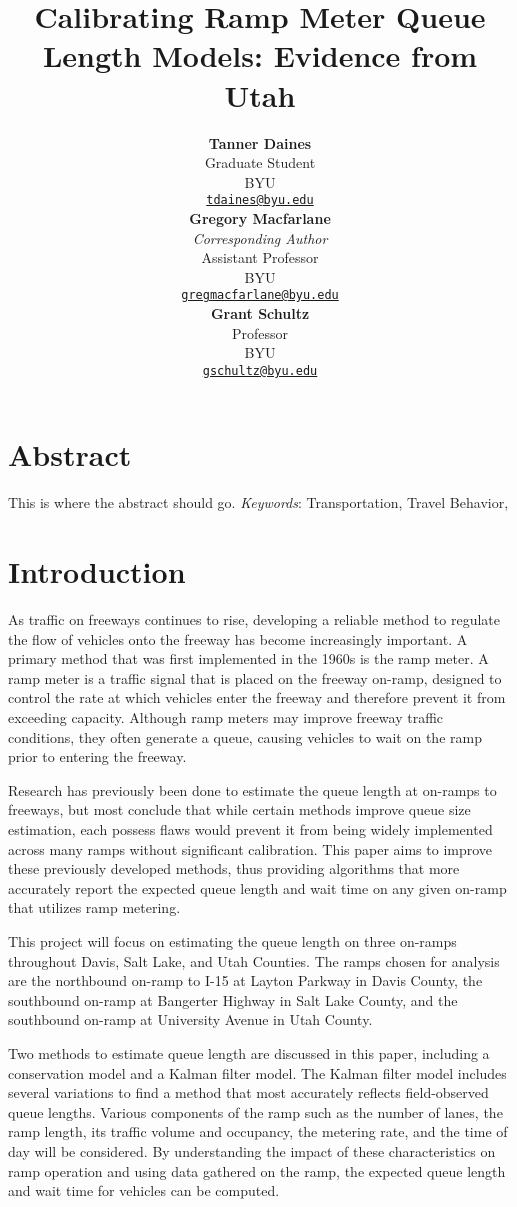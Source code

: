 \documentclass[numbered]{trbarticle}
\title{Calibrating Ramp Meter Queue Length Models: Evidence from Utah}
\author{%
    \textbf{Tanner Daines}\\
  \textit{}
  Graduate Student\\
  BYU\\
  \href{mailto:tdaines@byu.edu}{\nolinkurl{tdaines@byu.edu}}\\
  \hfill\break
    \textbf{Gregory Macfarlane}\\
  \textit{Corresponding Author\\}
  Assistant Professor\\
  BYU\\
  \href{mailto:gregmacfarlane@byu.edu}{\nolinkurl{gregmacfarlane@byu.edu}}\\
  \hfill\break
    \textbf{Grant Schultz}\\
  \textit{}
  Professor\\
  BYU\\
  \href{mailto:gschultz@byu.edu}{\nolinkurl{gschultz@byu.edu}}\\
  \hfill\break
  }
\begin{document}
\maketitle


\section{Abstract}
This is where the abstract should go.
\hfill\break%
\hfill\break%
\noindent\textit{Keywords}:  Transportation, Travel Behavior,  
\newpage

\hypertarget{intro}{%
\section{Introduction}\label{intro}}

As traffic on freeways continues to rise, developing a reliable method to regulate the flow of vehicles onto the freeway has become increasingly important. A primary method that was first implemented in the 1960s is the ramp meter. A ramp meter is a traffic signal that is placed on the freeway on-ramp, designed to control the rate at which vehicles enter the freeway and therefore prevent it from exceeding capacity. Although ramp meters may improve freeway traffic conditions, they often generate a queue, causing vehicles to wait on the ramp prior to entering the freeway.

Research has previously been done to estimate the queue length at on-ramps to freeways, but most conclude that while certain methods improve queue size estimation, each possess flaws would prevent it from being widely implemented across many ramps without significant calibration. This paper aims to improve these previously developed methods, thus providing algorithms that more accurately report the expected queue length and wait time on any given on-ramp that utilizes ramp metering.

This project will focus on estimating the queue length on three on-ramps throughout Davis, Salt Lake, and Utah Counties. The ramps chosen for analysis are the northbound on-ramp to I-15 at Layton Parkway in Davis County, the southbound on-ramp at Bangerter Highway in Salt Lake County, and the southbound on-ramp at University Avenue in Utah County.

Two methods to estimate queue length are discussed in this paper, including a conservation model and a Kalman filter model. The Kalman filter model includes several variations to find a method that most accurately reflects field-observed queue lengths. Various components of the ramp such as the number of lanes, the ramp length, its traffic volume and occupancy, the metering rate, and the time of day will be considered. By understanding the impact of these characteristics on ramp operation and using data gathered on the ramp, the expected queue length and wait time for vehicles can be computed.
\end{document}
